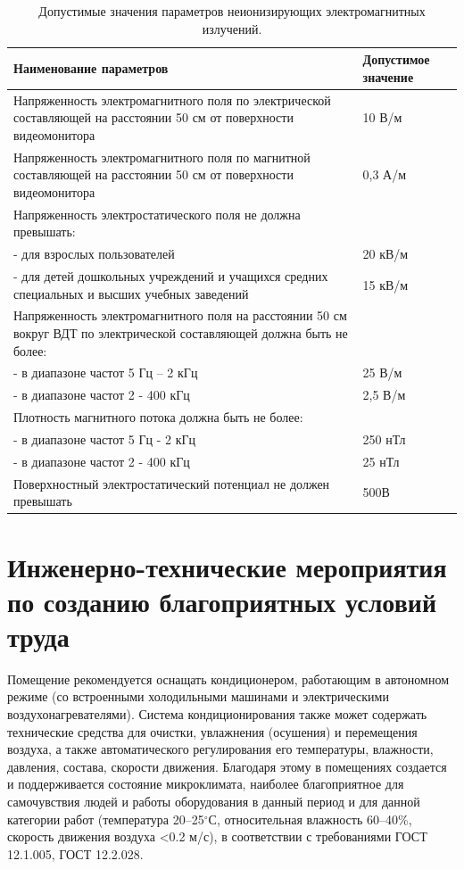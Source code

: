 \documentclass[12pt,a4paper]{report}
\begin{document}
\begin{table}[H]
\begin{center}
\begin{tabular}{|p{10cm}|p{2cm}|}
\hline
Наименование параметров  &Допустимое значение\\
\hline
Напряженность электромагнитного поля по электрической составляющей на расстоянии 50 см от поверхности видеомонитора	 &10 В/м\\
\hline
Напряженность электромагнитного поля по магнитной составляющей на расстоянии 50 см от поверхности видеомонитора      &0,3 А/м\\
\hline
Напряженность электростатического поля не должна превышать: &\\
 - для взрослых пользователей  &20 кВ/м\\
 - для детей дошкольных учреждений и учащихся средних специальных и высших учебных заведений  &15 кВ/м\\	
\hline
Напряженность электромагнитного поля  на расстоянии 50 см вокруг ВДТ по электрической составляющей должна быть не более: &\\
 - в диапазоне частот 5 Гц – 2 кГц  &25 В/м\\
 - в диапазоне частот 2 - 400 кГц   &2,5 В/м\\	
\hline
Плотность магнитного потока должна быть не более:  &\\
 - в диапазоне частот 5 Гц - 2 кГц   &250 нТл\\
 - в диапазоне частот 2 - 400 кГц 	 &25 нТл\\
\hline
Поверхностный электростатический потенциал не должен превышать  &500В\\
\hline
\end{tabular}
\end{center}
\caption{Допустимые значения параметров неионизирующих электромагнитных излучений.}
\label{tb:bgd5}
\end{table}

\section{Инженерно-технические мероприятия по созданию благоприятных условий труда}

Помещение рекомендуется оснащать кондиционером, работающим в автономном режиме (со встроенными холодильными машинами и электрическими воздухонагревателями). Система кондиционирования также может содержать технические средства для очистки, увлажнения (осушения) и перемещения воздуха, а также автоматического регулирования его температуры, влажности, давления, состава, скорости движения. Благодаря этому в помещениях создается и поддерживается состояние микроклимата, наиболее благоприятное для самочувствия людей и работы оборудования в данный период и для данной категории работ (температура 20–25$^\circ$С, относительная влажность 60–40\%, скорость движения воздуха <0.2 м/с), в соответствии с требованиями ГОСТ 12.1.005, ГОСТ 12.2.028.
\end{document}
